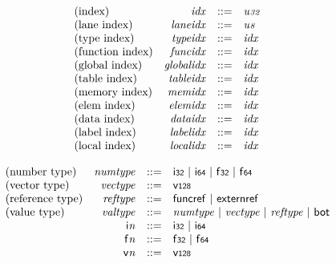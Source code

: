 $$
\begin{array}{@{}lrrl@{}l@{}}
\mbox{(index)} & {\mathit{idx}} &::=& {\mathit{u{\scriptstyle32}}} \\
\mbox{(lane index)} & {\mathit{laneidx}} &::=& {\mathit{u{\scriptstyle8}}} \\
\mbox{(type index)} & {\mathit{typeidx}} &::=& {\mathit{idx}} \\
\mbox{(function index)} & {\mathit{funcidx}} &::=& {\mathit{idx}} \\
\mbox{(global index)} & {\mathit{globalidx}} &::=& {\mathit{idx}} \\
\mbox{(table index)} & {\mathit{tableidx}} &::=& {\mathit{idx}} \\
\mbox{(memory index)} & {\mathit{memidx}} &::=& {\mathit{idx}} \\
\mbox{(elem index)} & {\mathit{elemidx}} &::=& {\mathit{idx}} \\
\mbox{(data index)} & {\mathit{dataidx}} &::=& {\mathit{idx}} \\
\mbox{(label index)} & {\mathit{labelidx}} &::=& {\mathit{idx}} \\
\mbox{(local index)} & {\mathit{localidx}} &::=& {\mathit{idx}} \\
\end{array}
$$

\vspace{1ex}

\vspace{1ex}

$$
\begin{array}{@{}lrrl@{}l@{}}
\mbox{(number type)} & {\mathit{numtype}} &::=& \mathsf{i{\scriptstyle32}} ~|~ \mathsf{i{\scriptstyle64}} ~|~ \mathsf{f{\scriptstyle32}} ~|~ \mathsf{f{\scriptstyle64}} \\
\mbox{(vector type)} & {\mathit{vectype}} &::=& \mathsf{v{\scriptstyle128}} \\
\mbox{(reference type)} & {\mathit{reftype}} &::=& \mathsf{funcref} ~|~ \mathsf{externref} \\
\mbox{(value type)} & {\mathit{valtype}} &::=& {\mathit{numtype}} ~|~ {\mathit{vectype}} ~|~ {\mathit{reftype}} ~|~ \mathsf{bot} \\
& {\mathsf{i}}{{\mathit{n}}} &::=& \mathsf{i{\scriptstyle32}} ~|~ \mathsf{i{\scriptstyle64}} \\
& {\mathsf{f}}{{\mathit{n}}} &::=& \mathsf{f{\scriptstyle32}} ~|~ \mathsf{f{\scriptstyle64}} \\
& {\mathsf{v}}{{\mathit{n}}} &::=& \mathsf{v{\scriptstyle128}} \\
\end{array}
$$

